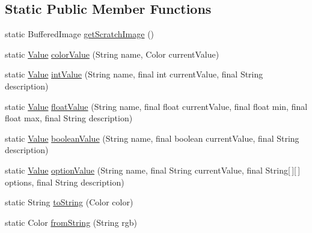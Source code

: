 \subsection*{Static Public Member Functions}
\begin{DoxyCompactItemize}
\item 
static Buffered\+Image \mbox{\hyperlink{classorg_1_1newdawn_1_1slick_1_1font_1_1effects_1_1_effect_util_a0a6af9e796e02dc40cfdf20d2fce6675}{get\+Scratch\+Image}} ()
\item 
static \mbox{\hyperlink{interfaceorg_1_1newdawn_1_1slick_1_1font_1_1effects_1_1_configurable_effect_1_1_value}{Value}} \mbox{\hyperlink{classorg_1_1newdawn_1_1slick_1_1font_1_1effects_1_1_effect_util_a6119da83290f5612831d5b7095279604}{color\+Value}} (String name, Color current\+Value)
\item 
static \mbox{\hyperlink{interfaceorg_1_1newdawn_1_1slick_1_1font_1_1effects_1_1_configurable_effect_1_1_value}{Value}} \mbox{\hyperlink{classorg_1_1newdawn_1_1slick_1_1font_1_1effects_1_1_effect_util_a1f4fda4bfa9dfb9820d966f060d835b9}{int\+Value}} (String name, final int current\+Value, final String description)
\item 
static \mbox{\hyperlink{interfaceorg_1_1newdawn_1_1slick_1_1font_1_1effects_1_1_configurable_effect_1_1_value}{Value}} \mbox{\hyperlink{classorg_1_1newdawn_1_1slick_1_1font_1_1effects_1_1_effect_util_a146f4a4f2ef4ea6e5b1ac388911a0c46}{float\+Value}} (String name, final float current\+Value, final float min, final float max, final String description)
\item 
static \mbox{\hyperlink{interfaceorg_1_1newdawn_1_1slick_1_1font_1_1effects_1_1_configurable_effect_1_1_value}{Value}} \mbox{\hyperlink{classorg_1_1newdawn_1_1slick_1_1font_1_1effects_1_1_effect_util_a7e64605c76343d015b84deed524683e8}{boolean\+Value}} (String name, final boolean current\+Value, final String description)
\item 
static \mbox{\hyperlink{interfaceorg_1_1newdawn_1_1slick_1_1font_1_1effects_1_1_configurable_effect_1_1_value}{Value}} \mbox{\hyperlink{classorg_1_1newdawn_1_1slick_1_1font_1_1effects_1_1_effect_util_a5e01a6d3ca0dfca854a24b9cacb264a0}{option\+Value}} (String name, final String current\+Value, final String\mbox{[}$\,$\mbox{]}\mbox{[}$\,$\mbox{]} options, final String description)
\item 
static String \mbox{\hyperlink{classorg_1_1newdawn_1_1slick_1_1font_1_1effects_1_1_effect_util_a1848c80a85521b5ddf5e1e360ec9fc89}{to\+String}} (Color color)
\item 
static Color \mbox{\hyperlink{classorg_1_1newdawn_1_1slick_1_1font_1_1effects_1_1_effect_util_a4a27da64c5e3e47de876183595fe7f75}{from\+String}} (String rgb)
\end{DoxyCompactItemize}
